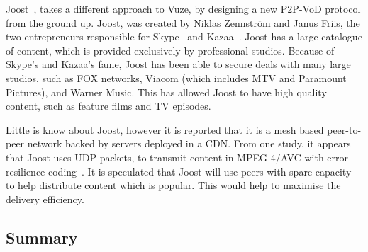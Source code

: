     Joost~\cite{joost}, takes a different approach to Vuze, by designing a new P2P-VoD protocol from the ground up. Joost, was created by Niklas Zennstr\"om and Janus Friis, the two entrepreneurs responsible for Skype~\cite{skype} and Kazaa~\cite{kazaa}. Joost has a large catalogue of content, which is provided exclusively by professional studios. Because of Skype's and Kazaa's fame, Joost has been able to secure deals with many large studios, such as FOX networks, Viacom (which includes MTV and Paramount Pictures), and Warner Music. This has allowed Joost to have high quality content, such as feature films and TV episodes.

    Little is know about Joost, however it is reported that it is a mesh based peer-to-peer network backed by servers deployed in a CDN. From one study, it appears that Joost uses UDP packets, to transmit content in MPEG-4/AVC with error-resilience coding~\cite{krieger2008aaq}. It is speculated that Joost will use peers with spare capacity to help distribute content which is popular. This would help to maximise the delivery efficiency.


\subsection{Summary}



